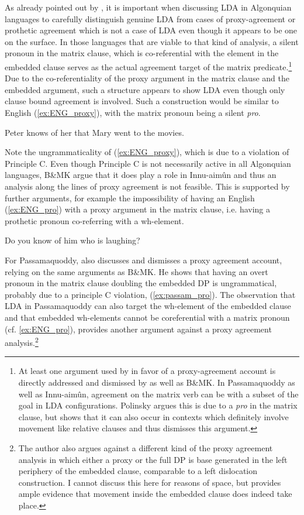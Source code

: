 \documentclass[output=paper
,modfonts
,nonflat]{langsci/langscibook}
\begin{document}
As already pointed out by \citet{Polinsky2003}, it is important when discussing LDA in Algonquian languages to carefully distinguish genuine LDA from cases of proxy-agreement or prothetic agreement which is not a case of LDA even though it appears to be one on the surface. In those languages that are viable to that kind of analysis, a silent pronoun in the matrix clause, which is co-referential with the element in the embedded clause serves as the actual agreement target of the matrix predicate.\footnote{At least one argument used by \citet{Polinsky2003} in favor of a proxy-agreement account is directly addressed and dismissed by \citet{Bruening2001a} as well as B\&MK. In Passamaquoddy as well as Innu-aim\^{u}n, agreement on the matrix verb can be with a subset of the goal in LDA configurations. Polinsky argues this is due to a \textit{pro} in the matrix clause, but \citet[][269]{Bruening2001a} shows that it can also occur in contexts which definitely involve movement like relative clauses and thus dismisses this argument.} Due to the co-referentiality of the proxy argument in the matrix clause and the embedded argument, such a structure appears to show LDA even though only clause bound agreement is involved. Such a construction would be similar to English (\ref{ex:ENG_proxy}), with the matrix pronoun being a silent \textit{pro}.
\begin{exe}
\ex *Peter knows of her that Mary went to the movies. \label{ex:ENG_proxy}
\end{exe}
Note the ungrammaticality of (\ref{ex:ENG_proxy}), which is due to a violation of Principle C. Even though Principle C is not necessarily active in all Algonquian languages, B\&MK argue that it does play a role in Innu-aim\^{u}n and thus an analysis along the lines of proxy agreement is not feasible. This is supported by further arguments, for example the impossibility of having an English (\ref{ex:ENG_pro}) with a proxy argument in the matrix clause, i.e. having a prothetic pronoun co-referring with a wh-element.
\begin{exe}
\ex *Do you know of him who is laughing? \label{ex:ENG_pro}
\end{exe}
For Passamaquoddy, \citet{Bruening2001a} also discusses and dismisses a proxy agreement account, relying on the same arguments as B\&MK. He shows that having an overt pronoun in the matrix clause doubling the embedded DP is ungrammatical, probably due to a principle C violation, (\ref{ex:passam_pro}). The observation that LDA in Passamaquoddy can also target the wh-element of the embedded clause and that embedded wh-elements cannot be coreferential with a matrix pronoun (cf. \ref{ex:ENG_pro}), provides another argument against a proxy agreement analysis.\footnote{The author also argues against a different kind of the proxy agreement analysis in which either a proxy or the full DP is base generated in the left periphery of the embedded clause, comparable to a left dislocation construction. I cannot discuss this here for reasons of space, but  \citet[][263ff]{Bruening2001a} provides ample evidence that movement inside the embedded clause does indeed take place.}
\end{document}
